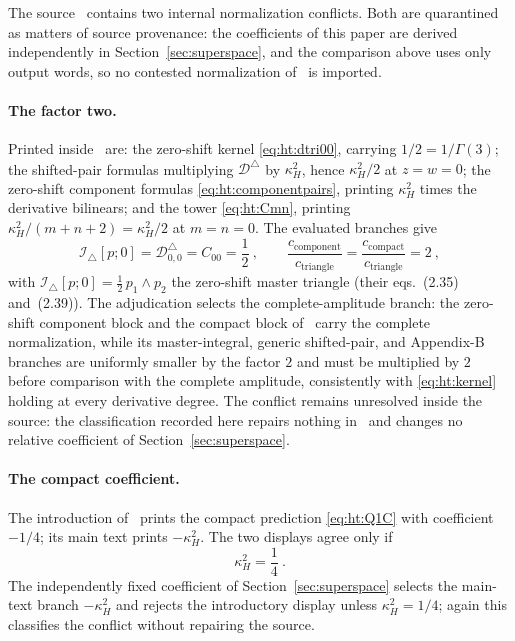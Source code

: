 The source~\cite{BK} contains two internal normalization conflicts. Both are
quarantined as matters of source provenance: the coefficients of this paper
are derived independently in Section~\ref{sec:superspace}, and the comparison
above uses only output words, so no contested normalization of~\cite{BK} is
imported.

\paragraph{The factor two.} Printed inside~\cite{BK} are: the zero-shift
kernel \eqref{eq:ht:dtri00}, carrying $1/2=1/\Gamma(3)$; the shifted-pair
formulas multiplying $\mathcal D^{\triangle}$ by $\kappa_{H}^{2}$, hence
$\kappa_{H}^{2}/2$ at $z=w=0$; the zero-shift component formulas
\eqref{eq:ht:componentpairs}, printing $\kappa_{H}^{2}$ times the derivative
bilinears; and the tower \eqref{eq:ht:Cmn}, printing
$\kappa_{H}^{2}/(m+n+2)=\kappa_{H}^{2}/2$ at $m=n=0$. The evaluated branches
give
\begin{equation}\label{eq:ht:branches}
\mathcal I_{\triangle}[p;0]
=\mathcal D^{\triangle}_{0,0}
=C_{00}
=\frac12 \ ,
\qquad
\frac{c_{\mathrm{component}}}{c_{\mathrm{triangle}}}
=\frac{c_{\mathrm{compact}}}{c_{\mathrm{triangle}}}
=2 \ ,
\end{equation}
with $\mathcal I_{\triangle}[p;0]=\tfrac12\,p_{1}\wedge p_{2}$ the zero-shift
master triangle (their eqs.~(2.35) and~(2.39)). The adjudication selects the
complete-amplitude branch: the zero-shift component block and the compact
block of~\cite{BK} carry the complete normalization, while its
master-integral, generic shifted-pair, and Appendix-B branches are uniformly
smaller by the factor $2$ and must be multiplied by $2$ before comparison
with the complete amplitude, consistently with \eqref{eq:ht:kernel} holding
at every derivative degree. The conflict remains unresolved inside the
source: the classification recorded here repairs nothing in~\cite{BK} and
changes no relative coefficient of Section~\ref{sec:superspace}.

\paragraph{The compact coefficient.} The introduction of~\cite{BK} prints
the compact prediction \eqref{eq:ht:Q1C} with coefficient $-1/4$; its main
text prints $-\kappa_{H}^{2}$. The two displays agree only if
\begin{equation}\label{eq:ht:conflict2}
\kappa_{H}^{2}=\frac14 \ .
\end{equation}
The independently fixed coefficient of Section~\ref{sec:superspace} selects
the main-text branch $-\kappa_{H}^{2}$ and rejects the introductory display
unless $\kappa_{H}^{2}=1/4$; again this classifies the conflict without
repairing the source.

